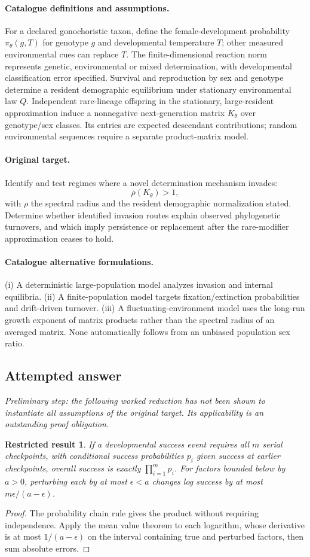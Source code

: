 \documentclass[11pt]{article}
\newtheorem{attemptresult}{Restricted result}[section]
\begin{document}
\paragraph{Catalogue definitions and assumptions.}
For a declared gonochoristic taxon, define the female-development probability $\pi_\theta(g,T)$ for genotype $g$ and developmental temperature $T$; other measured environmental cues can replace $T$. The finite-dimensional reaction norm represents genetic, environmental or mixed determination, with developmental classification error specified. Survival and reproduction by sex and genotype determine a resident demographic equilibrium under stationary environmental law $Q$. Independent rare-lineage offspring in the stationary, large-resident approximation induce a nonnegative next-generation matrix $K_\theta$ over genotype/sex classes. Its entries are expected descendant contributions; random environmental sequences require a separate product-matrix model.
\paragraph{Original target.}
Identify and test regimes where a novel determination mechanism invades:
    \[\rho(K_\theta)>1,\]
    with $\rho$ the spectral radius and the resident demographic normalization stated. Determine whether identified invasion routes explain observed phylogenetic turnovers, and which imply persistence or replacement after the rare-modifier approximation ceases to hold.
\paragraph{Catalogue alternative formulations.}
(i) A deterministic large-population model analyzes invasion and internal equilibria. (ii) A finite-population model targets fixation/extinction probabilities and drift-driven turnover. (iii) A fluctuating-environment model uses the long-run growth exponent of matrix products rather than the spectral radius of an averaged matrix. None automatically follows from an unbiased population sex ratio.
\subsection{Attempted answer}
\noindent\emph{Preliminary step: the following worked reduction has not been shown to instantiate all assumptions of the original target. Its applicability is an outstanding proof obligation.}

\begin{attemptresult}
If a developmental success event requires all $m$ serial checkpoints, with conditional success probabilities $p_i$ given success at earlier checkpoints, overall success is exactly $\prod_{i=1}^mp_i$. For factors bounded below by $a>0$, perturbing each by at most $\epsilon<a$ changes log success by at most $m\epsilon/(a-\epsilon)$.
\end{attemptresult}
\begin{proof}
The probability chain rule gives the product without requiring independence. Apply the mean value theorem to each logarithm, whose derivative is at most $1/(a-\epsilon)$ on the interval containing true and perturbed factors, then sum absolute errors.
\end{proof}
\end{document}
